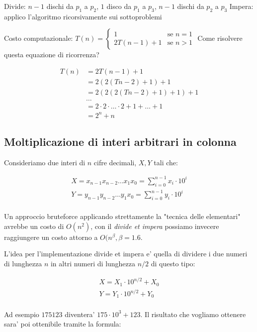 \documentclass{article}
\begin{document}
Divide: $n-1$ dischi da $p_1$ a $p_2$, $1$ disco da $p_1$ a $p_3$, $n-1$ dischi
da $p_2$ a $p_3$
Impera: applico l'algoritmo ricorsivamente sui sottoproblemi

Costo computazionale: $T(n) = \begin{cases}
  1 &\text{se } n = 1 \\
  2 T(n-1) + 1 &\text{se } n > 1
\end{cases}$
Come risolvere questa equazione di ricorrenza?

\begin{align*}
  T(n) &= 2 T(n-1) + 1 \\
    &= 2 ( 2(Tn-2) + 1) + 1 \\
    &= 2 ( 2 ( 2(Tn-2) + 1) + 1) + 1 \\
    &\ldots \\
    &= 2\cdot2\cdot\ldots\cdot2 + 1 + \ldots + 1 \\
    &= 2^n + n
\end{align*}

\subsection{Moltiplicazione di interi arbitrari in colonna}

Consideriamo due interi di $n$ cifre decimali, $X, Y$ tali che:

\begin{align*}
  X = x_{n-1} x_{n-2} \ldots x_1 x_0 = \sum^{n-1}_{i=0} x_i \cdot 10^{i} \\
  Y = y_{n-1} y_{n-2} \ldots y_1 x_0 = \sum^{n-1}_{i=0} y_i \cdot 10^{i} \\
\end{align*}

Un approccio bruteforce applicando strettamente la "tecnica delle elementari"
avrebbe un costo di $O(n^2)$, con il \emph{divide et impera} possiamo invecere
raggiungere un costo attorno a $O(n^{\beta}, \beta = 1.6$.

L'idea per l'implementazione divide et impera e' quella di dividere i due numeri
di lunghezza $n$ in altri numeri di lunghezza $n/2$ di questo tipo:

\begin{align*}
  X = X_1 \cdot 10^{n/2} + X_0 \\
  Y = Y_1 \cdot 10^{n/2} + Y_0 \\
\end{align*}

Ad esempio $175123$ diventera' $175 \cdot 10^3 + 123$.
Il risultato che vogliamo ottenere sara' poi ottenibile tramite la formula:
\end{document}
